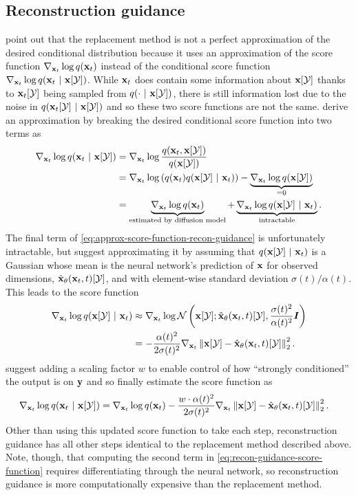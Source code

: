 \subsection{Reconstruction guidance} \label{sec:reconstruction-guidance}
\citet{ho2022video} point out that the replacement method is not a perfect approximation of the desired conditional distribution because it uses an approximation of the score function $\nabla_{{\mathbf{x}}_t} \log q({\mathbf{x}}_t)$ instead of the conditional score function $\nabla_{{\mathbf{x}}_t} \log q({\mathbf{x}}_t~|~{\mathbf{x}}[{\mathcal{Y}}])$. While ${\mathbf{x}}_t$ does contain some information about ${\mathbf{x}}[{\mathcal{Y}}]$ thanks to ${\mathbf{x}}_t[{\mathcal{Y}}]$ being sampled from $q(\cdot ~|~ {\mathbf{x}}[{\mathcal{Y}}])$, there is still information lost due to the noise in $q({\mathbf{x}}_t[{\mathcal{Y}}] ~|~ {\mathbf{x}}[{\mathcal{Y}}])$ and so these two score functions are not the same. \citet{ho2022video} derive an approximation by breaking the desired conditional score function into two terms as
\begin{align}
    \nabla_{{\mathbf{x}}_t} \log q({\mathbf{x}}_t~|~{\mathbf{x}}[{\mathcal{Y}}]) &= \nabla_{{\mathbf{x}}_t} \log \frac{q({\mathbf{x}}_t, {\mathbf{x}}[{\mathcal{Y}}])}{q({\mathbf{x}}[{\mathcal{Y}}])}\\
    &= \nabla_{{\mathbf{x}}_t} \log \left( q({\mathbf{x}}_t) q({\mathbf{x}}[{\mathcal{Y}}]~|~{\mathbf{x}}_t) \right) - \underbrace{\nabla_{{\mathbf{x}}_t} \log q({\mathbf{x}}[{\mathcal{Y}}])}_{=0} \\
    &= \underbrace{\nabla_{{\mathbf{x}}_t} \log q({\mathbf{x}}_t)}_\text{estimated by diffusion model} + \underbrace{\nabla_{{\mathbf{x}}_t} \log q({\mathbf{x}}[{\mathcal{Y}}]~|~{\mathbf{x}}_t)}_\text{intractable}. \label{eq:approx-score-function-recon-guidance}
\end{align}
The final term of \cref{eq:approx-score-function-recon-guidance} is unfortunately intractable, but \citet{ho2022video} suggest approximating it by assuming that $q({\mathbf{x}}[{\mathcal{Y}}]~|~{\mathbf{x}}_t)$ is a Gaussian whose mean is the neural network's prediction of ${\mathbf{x}}$ for observed dimensions, $\hat{{\mathbf{x}}}_\theta({\mathbf{x}}_t, t)[{\mathcal{Y}}]$, and with element-wise standard deviation $\sigma(t) / \alpha(t)$. This leads to the score function
\begin{align}
    \nabla_{{\mathbf{x}}_t} \log q({\mathbf{x}}[{\mathcal{Y}}]~|~{\mathbf{x}}_t) &\approx \nabla_{{\mathbf{x}}_t} \log {\mathcal{N}} \left( {\mathbf{x}}[{\mathcal{Y}}]; \hat{{\mathbf{x}}}_\theta({\mathbf{x}}_t, t)[{\mathcal{Y}}], \frac{\sigma(t)^2}{\alpha(t)^2} {\bm{I}} \right) \\
    &= -\frac{\alpha(t)^2}{2\sigma(t)^2} \nabla_{{\mathbf{x}}_t} \left\| {\mathbf{x}}[{\mathcal{Y}}] - \hat{{\mathbf{x}}}_\theta({\mathbf{x}}_t, t)[{\mathcal{Y}}] \right\|_2^2.
\end{align}
\citet{ho2022video} suggest adding a scaling factor $w$ to enable control of how ``strongly conditioned'' the output is on ${\mathbf{y}}$ and so finally estimate the score function as 
\begin{align}
    \nabla_{{\mathbf{x}}_t} \log q({\mathbf{x}}_t~|~{\mathbf{x}}[{\mathcal{Y}}]) &= \nabla_{{\mathbf{x}}_t} \log q({\mathbf{x}}_t) - \frac{w \cdot \alpha(t)^2}{2\sigma(t)^2} \nabla_{{\mathbf{x}}_t} \left\| {\mathbf{x}}[{\mathcal{Y}}] - \hat{{\mathbf{x}}}_\theta({\mathbf{x}}_t, t)[{\mathcal{Y}}] \right\|_2^2 . \label{eq:recon-guidance-score-function}
\end{align}
Other than using this updated score function to take each step, reconstruction guidance has all other steps identical to the replacement method described above. Note, though, that computing the second term in \cref{eq:recon-guidance-score-function} requires differentiating through the neural network, so reconstruction guidance is more computationally expensive than the replacement method. 

